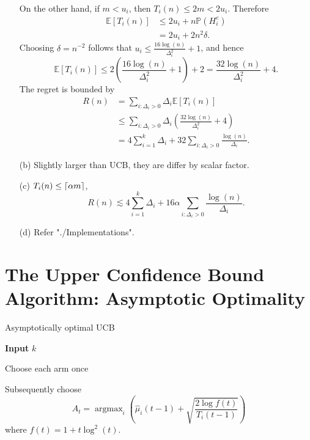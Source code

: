 \documentclass[10pt]{article}
\theoremstyle{definition}
\newenvironment{solution*}[1]{%
  \IfBlankTF{#1}
    {\renewcommand{\themanualsolutioninner}{\unskip}}
    {\renewcommand\themanualsolutioninner{#1}}%
  \manualsolutioninner
}{\endmanualsolutioninner}
\DeclareMathOperator*{\argmax}{argmax}
\DeclarePairedDelimiter{\ceil}{\lceil}{\rceil}
\begin{document}
\begin{solution*}{}
\begin{itemize}
        On the other hand, if $m < u_i$, then $T_i(n) \leq 2m < 2 u_i$.
        Therefore
        \begin{align*}
            \mathbb{E}[T_i(n)] &\leq 2 u_i + n\mathbb{P}(H_i^c) \\
            &= 2u_i + 2n^2 \delta.
        \end{align*}
        Choosing $\delta = n^{-2}$ follows that $u_i \leq \frac{16 \log(n)}{\Delta_i^2} + 1$, and hence
        \begin{equation*}
            \mathbb{E}[T_i(n)] \leq 2 \left( \frac{16 \log(n)}{\Delta_i^2} + 1 \right) + 2 = \frac{32 \log(n)}{\Delta_i^2} + 4.
        \end{equation*}
        The regret is bounded by
        \begin{align*}
            R(n) &= \sum_{i: \Delta_i > 0} \Delta_i \mathbb{E}[T_i(n)] \\
            &\leq \sum_{i: \Delta_i > 0} \Delta_i \left( \frac{32 \log(n)}{\Delta_i^2} + 4 \right) \\
            &= 4\sum_{i=1}^{k}\Delta_i + 32 \sum_{i: \Delta_i > 0} \frac{\log(n)}{\Delta_i}.
        \end{align*}
        \item[(b)] Slightly larger than UCB, they are differ by scalar factor.
        \item[(c)] $T_i(n) \leq \ceil{\alpha m}$,
        \begin{equation*}
        R(n) \lesssim 4\sum_{i=1}^{k}\Delta_i + 16 \alpha \sum_{i: \Delta_i > 0} \frac{\log(n)}{\Delta_i}.
        \end{equation*}
        \item[(d)] Refer "./Implementations".
    \end{itemize}
\end{solution*}


\section{The Upper Confidence Bound Algorithm: Asymptotic Optimality}

\begin{algorithm*}[H]
    \caption{Asymptotically optimal UCB}
    \textbf{Input} $k$

    Choose each arm once

    Subsequently choose
    \begin{equation*}
        A_t = \argmax_i \left(\hat{\mu}_i (t-1) + \sqrt{\frac{2 \log f(t)}{T_i(t-1)}}\right)
    \end{equation*}
    where $f(t) = 1 + t \log^2(t)$.
\end{algorithm*}
\end{document}
